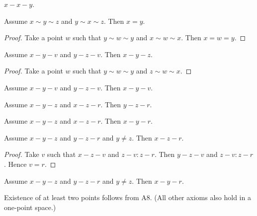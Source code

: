 \documentclass{article}
\newcommand{\Betw}[3]{#1 {\sim} #2 {\sim} #3}
\begin{document}
  \begin{forthel}
    \begin{lemma}[L3o3]
      $x-x-y$.
    \end{lemma}

    \begin{lemma} %
      Assume $\Betw{x}{y}{z}$ and $\Betw{y}{x}{z}$.
      Then $x = y$.
    \end{lemma}
    \begin{proof}
      Take a point $w$ such that
      $\Betw{y}{w}{y}$ and $\Betw{x}{w}{x}$.
      Then $x = w = y$.
    \end{proof}

    \begin{lemma} %
      Assume $x-y-v$ and $y-z-v$. Then $x-y-z$.
    \end{lemma}
    \begin{proof}
      Take a point $w$ such that
      $\Betw{y}{w}{y}$ and $\Betw{z}{w}{x}$.
    \end{proof}

    \begin{lemma} %
      Assume $x-y-v$ and $y-z-v$. Then $x-y-v$.
    \end{lemma}

    \begin{lemma}[L3o6a]
      Assume $x-y-z$ and $x-z-r$. Then $y-z-r$.
    \end{lemma}

    \begin{lemma}[L3o6b]
      Assume $x-y-z$ and $x-z-r$. Then $x-y-r$.
    \end{lemma}

    \begin{lemma}[L3o7a]
      Assume $x-y-z$ and $y-z-r$ and $y \neq z$. Then $x-z-r$.
    \end{lemma}
    \begin{proof}
    	Take $v$ such that $x-z-v$ and $z-v : z-r$.	Then $y-z-v$ and $z-v : z-r$. Hence $v = r$.
    \end{proof}

    \begin{lemma}[L3o7b]
      Assume $x-y-z$ and $y-z-r$ and $y \neq z$. Then $x-y-r$.
    \end{lemma}
  \end{forthel}

  Existence of at least two points follows from A8. (All other axioms also hold in a one-point space.)
\end{document}
